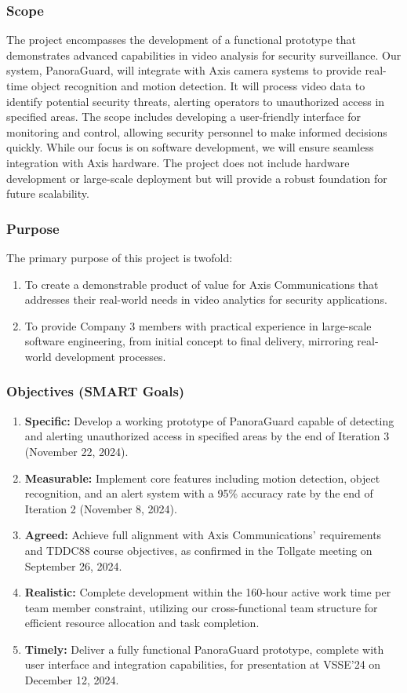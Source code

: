 \subsubsection{Scope}
The project encompasses the development of a functional prototype that demonstrates advanced capabilities in video analysis for security surveillance. Our system, PanoraGuard, will integrate with Axis camera systems to provide real-time object recognition and motion detection. It will process video data to identify potential security threats, alerting operators to unauthorized access in specified areas. The scope includes developing a user-friendly interface for monitoring and control, allowing security personnel to make informed decisions quickly. While our focus is on software development, we will ensure seamless integration with Axis hardware. The project does not include hardware development or large-scale deployment but will provide a robust foundation for future scalability.
    
\subsubsection{Purpose}
The primary purpose of this project is twofold:
\begin{enumerate}
    \item To create a demonstrable product of value for Axis Communications that addresses their real-world needs in video analytics for security applications.
    \item To provide Company 3 members with practical experience in large-scale software engineering, from initial concept to final delivery, mirroring real-world development processes.
\end{enumerate}
    
\subsubsection{Objectives (SMART Goals)}
\begin{enumerate}
    \item \textbf{Specific:} Develop a working prototype of PanoraGuard capable of detecting and alerting unauthorized access in specified areas by the end of Iteration 3 (November 22, 2024).
    \item \textbf{Measurable:} Implement core features including motion detection, object recognition, and an alert system with a 95\% accuracy rate by the end of Iteration 2 (November 8, 2024).
    \item \textbf{Agreed:} Achieve full alignment with Axis Communications' requirements and TDDC88 course objectives, as confirmed in the Tollgate meeting on September 26, 2024.
    \item \textbf{Realistic:} Complete development within the 160-hour active work time per team member constraint, utilizing our cross-functional team structure for efficient resource allocation and task completion.
    \item \textbf{Timely:} Deliver a fully functional PanoraGuard prototype, complete with user interface and integration capabilities, for presentation at VSSE'24 on December 12, 2024.
\end{enumerate}
    
